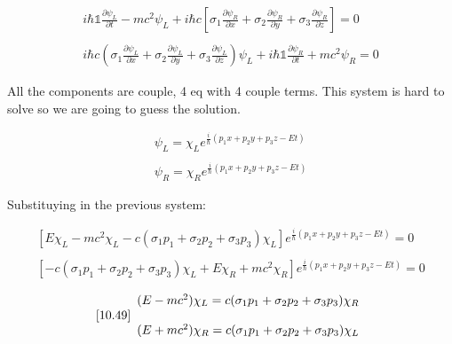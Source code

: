 \begin{equation}
  \begin{array}{c}
    i\hbar \mathbb{1} \frac{\partial \psi_L}{\partial t} - mc^2\psi_L + i\hbar c \left[\sigma_1\frac{\partial \psi_R}{\partial x}+\sigma_2\frac{\partial \psi_R}{\partial y}+\sigma_3\frac{\partial \psi_R}{\partial z}\right] = 0
    \\

    \\
    i\hbar c\left(\sigma_1 \frac{\partial \psi_L}{\partial x} + \sigma_2 \frac{\partial \psi_L}{\partial y}+ \sigma_3 \frac{\partial \psi_L}{\partial z}\right) \psi_L + i\hbar \mathbb{1} \frac{\partial \psi_R}{\partial t} + mc^2\psi_R = 0
  \end{array}
\end{equation}

All the components are couple, 4 eq with 4 couple terms. This system is hard to solve so we are going to guess the solution.

\begin{equation}
  \begin{array}{c}
    \psi_L = \chi_L e^{\frac{i}{\hbar}(p_1 x + p_2 y + p_3 z - Et)}
    \\

    \\
    \psi_R = \chi_R e^{\frac{i}{\hbar}(p_1 x + p_2 y + p_3 z - Et)}
  \end{array}
\end{equation}

Substituying in the previous system:

\begin{equation}
  \begin{array}{c}
    \left[E\chi_L - mc^2\chi_L- c\left(\sigma_1 p_1 + \sigma_2 p_2 + \sigma_3 p_3\right)\chi_L\right]e^{\frac{i}{\hbar}(p_1 x + p_2 y + p_3 z - Et)} = 0
    \\

    \\
    \left[-c\left( \sigma_1 p_1 + \sigma_2 p_2 + \sigma_3 p_3 \right)\chi_L + E\chi_R+ mc^2\chi_R\right] e^{\frac{i}{\hbar}(p_1 x + p_2 y + p_3 z - Et)} = 0
  \end{array}
\end{equation}

\begin{equation}
  \ref{10.49}
  \begin{array}{c}
    (E-mc^2) \chi_L = c (\sigma_1 p_1 + \sigma_2 p_2 + \sigma_3 p_3)\chi_R
    \\

    \\
    (E+mc^2) \chi_R = c (\sigma_1 p_1 + \sigma_2 p_2 + \sigma_3 p_3)\chi_L
  \end{array}
\end{equation}

